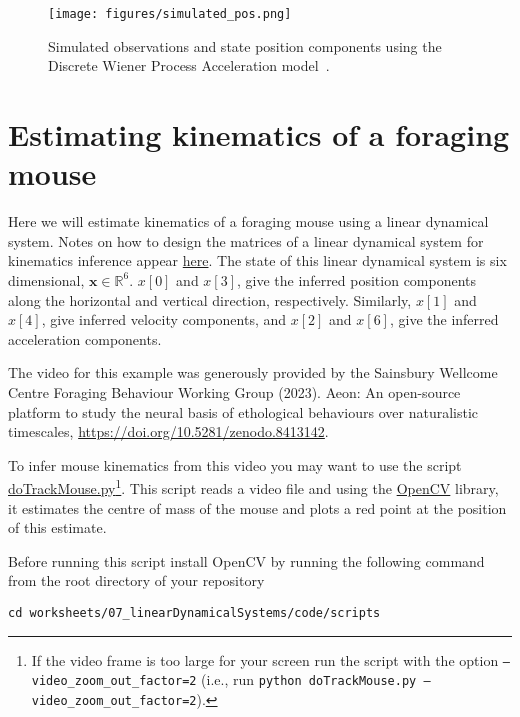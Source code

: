 \documentclass[12pt]{article}
\begin{document}
\begin{figure}[h]
	\begin{center}
		\texttt{[image: figures/simulated\_pos.png]}
		\label{fig:simulated_pos}
		\caption{Simulated observations and state position components
              using the Discrete Wiener Process Acceleration
              model~\citep[][Section 6.3.3]{barShalomEtAl04}.}
	\end{center}
\end{figure}

\section{Estimating kinematics of a foraging mouse}

Here we will estimate kinematics of a foraging mouse using a linear dynamical
system. Notes on how to design the matrices of a linear dynamical system for
kinematics inference appear
\href{https://github.com/joacorapela/lds_python/blob/master/docs/tracking/tracking.pdf}{here}.
The state of this linear dynamical system is six dimensional,
$\mathbf{x}\in\mathbb{R}^6$. $x[0]$ and $x[3]$, give the inferred
position components along the horizontal and vertical direction, respectively.
Similarly, $x[1]$ and $x[4]$, give inferred velocity components, and $x[2]$ and
$x[6]$, give the inferred acceleration components.

The video for this example was generously provided by the
Sainsbury Wellcome Centre Foraging Behaviour Working Group (2023). Aeon: An
open-source platform to study the neural basis of ethological behaviours over
naturalistic timescales, \url{https://doi.org/10.5281/zenodo.8413142}.

To infer mouse kinematics from this video you may want to use the script
\href{https://github.com/joacorapela/neuroinformatics24/blob/master/worksheets/07_linearDynamicalSystems/code/scripts/doTrackMouse.py}{doTrackMouse.py}\footnote{If
the video frame is too large for your screen run the script with the option
\texttt{--video\_zoom\_out\_factor=2} (i.e., run \texttt{python
doTrackMouse.py --video\_zoom\_out\_factor=2}).}.
This script reads a video file and using the \href{https://opencv.org/}{OpenCV}
library, it estimates the centre of mass
of the mouse and plots a red point at the position of this estimate.

Before running this script install OpenCV by running the following command from the
root directory of your repository

\noindent\texttt{cd worksheets/07\_linearDynamicalSystems/code/scripts}
\end{document}
